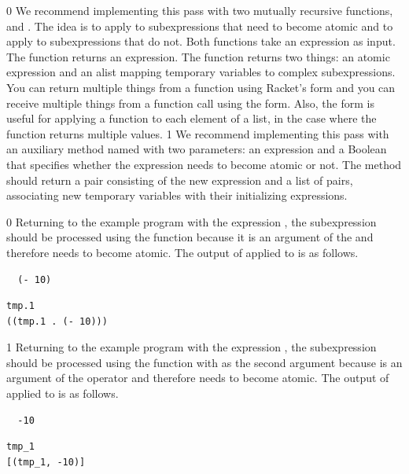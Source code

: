 \documentclass[7x10,nocrop]{TimesAPriori_MIT}%
\def\racketEd{0}
\def\pythonEd{1}
\def\edition{1}
\begin{document}
{\if\edition\racketEd
We recommend implementing this pass with two mutually recursive
functions,  and . The idea is to apply
 to subexpressions that need to become atomic and to
apply  to subexpressions that do not.  Both functions
take an \LangVar{} expression as input.  The  function
returns an expression.  The  function returns two
things: an atomic expression and an alist mapping temporary variables to
complex subexpressions. You can return multiple things from a function
using Racket's  form and you can receive multiple things
from a function call using the  form.
Also, the
\href{https://docs.racket-lang.org/reference/for.html#%28form._%28%28lib._racket%2Fprivate%2Fbase..rkt%29._for%2Flists%29%29}{\code{for/lists}}
  form is useful for applying a function to each element of a list, in
  the case where the function returns multiple values.
\fi}
%
{\if\edition\pythonEd
%
We recommend implementing this pass with an auxiliary method named
 with two parameters: an \LangVar{} expression and a
Boolean that specifies whether the expression needs to become atomic
or not.  The  method should return a pair consisting of
the new expression and a list of pairs, associating new temporary
variables with their initializing expressions.
%
\fi}

{\if\edition\racketEd
Returning to the example program with the expression , the subexpression  should be processed using the
 function because it is an argument of the \code{+} and
therefore needs to become atomic.  The output of 
applied to  is as follows.
\begin{transformation}
\begin{lstlisting}
  (- 10)
\end{lstlisting}
\compilesto
\begin{lstlisting}
tmp.1
((tmp.1 . (- 10)))
\end{lstlisting}
\end{transformation}
\fi}
%
{\if\edition\pythonEd
%
Returning to the example program with the expression ,
the subexpression  should be processed using the
 function with  as the second argument
because  is an argument of the \code{+} operator and
therefore needs to become atomic.  The output of 
applied to  is as follows.
\begin{transformation}
\begin{lstlisting}
  -10
\end{lstlisting}
\compilesto
\begin{lstlisting}
tmp_1
[(tmp_1, -10)]
\end{lstlisting}
\end{transformation}
%  
\fi}
\end{document}
